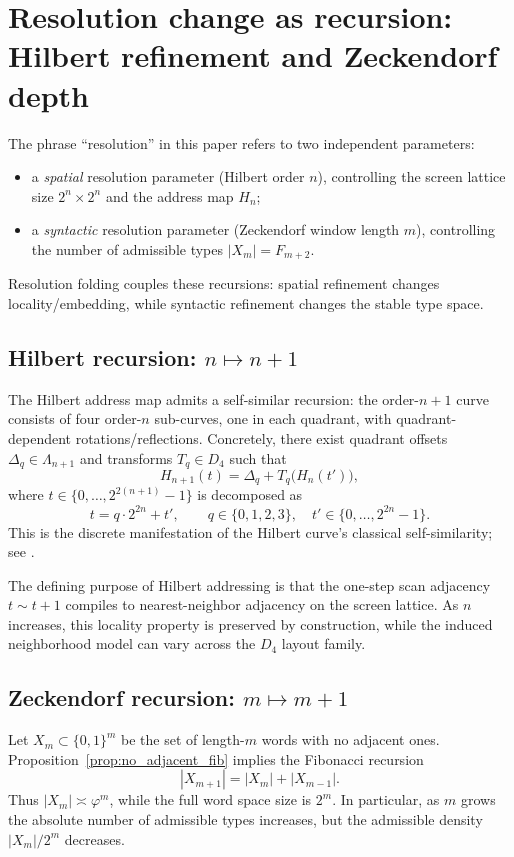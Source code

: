 
\section{Resolution change as recursion: Hilbert refinement and Zeckendorf depth}
\label{sec:resolution_recursion}

The phrase ``resolution'' in this paper refers to two independent parameters:
\begin{itemize}
\item a \emph{spatial} resolution parameter (Hilbert order $n$), controlling the screen lattice size $2^n\times 2^n$ and the address map $H_n$;
\item a \emph{syntactic} resolution parameter (Zeckendorf window length $m$), controlling the number of admissible types $|X_m|=F_{m+2}$.
\end{itemize}
Resolution folding couples these recursions: spatial refinement changes locality/embedding, while syntactic refinement changes the stable type space.

\subsection{Hilbert recursion: \texorpdfstring{$n\mapsto n+1$}{n->n+1}}
The Hilbert address map admits a self-similar recursion: the order-$n+1$ curve consists of four order-$n$ sub-curves, one in each quadrant, with quadrant-dependent rotations/reflections.
Concretely, there exist quadrant offsets $\Delta_q\in \Lambda_{n+1}$ and transforms $T_q\in D_4$ such that
\[
H_{n+1}(t)=\Delta_q + T_q\bigl(H_n(t')\bigr),
\]
where $t\in\{0,\dots,2^{2(n+1)}-1\}$ is decomposed as
\[
t=q\cdot 2^{2n}+t',\qquad q\in\{0,1,2,3\},\quad t'\in\{0,\dots,2^{2n}-1\}.
\]
This is the discrete manifestation of the Hilbert curve's classical self-similarity; see \cite{Sagan1994}.

\begin{remark}
The defining purpose of Hilbert addressing is that the one-step scan adjacency $t\sim t+1$ compiles to nearest-neighbor adjacency on the screen lattice.
As $n$ increases, this locality property is preserved by construction, while the induced neighborhood model can vary across the $D_4$ layout family.
\end{remark}

\subsection{Zeckendorf recursion: \texorpdfstring{$m\mapsto m+1$}{m->m+1}}
Let $X_m\subset\{0,1\}^m$ be the set of length-$m$ words with no adjacent ones.
Proposition~\ref{prop:no_adjacent_fib} implies the Fibonacci recursion
\[
|X_{m+1}|=|X_m|+|X_{m-1}|.
\]
Thus $|X_m|\asymp \varphi^m$, while the full word space size is $2^m$.
In particular, as $m$ grows the absolute number of admissible types increases, but the admissible density $|X_m|/2^m$ decreases.

